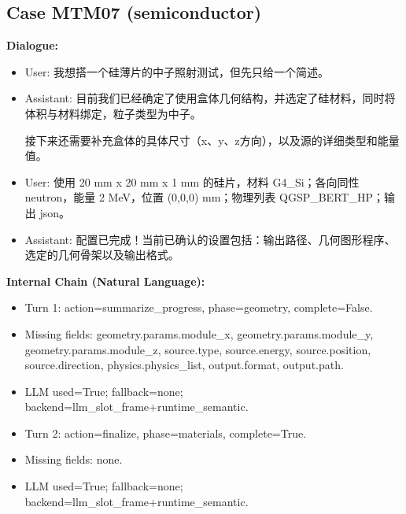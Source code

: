 \documentclass[11pt]{ctexart}
\begin{document}
\subsection{Case MTM07 (semiconductor)}
\textbf{Dialogue:}
\begin{itemize}
\item User: 我想搭一个硅薄片的中子照射测试，但先只给一个简述。
\item Assistant: 目前我们已经确定了使用盒体几何结构，并选定了硅材料，同时将体积与材料绑定，粒子类型为中子。

接下来还需要补充盒体的具体尺寸（x、y、z方向），以及源的详细类型和能量值。
\item User: 使用 20 mm x 20 mm x 1 mm 的硅片，材料 G4\_Si；各向同性 neutron，能量 2 MeV，位置 (0,0,0) mm；物理列表 QGSP\_BERT\_HP；输出 json。
\item Assistant: 配置已完成！当前已确认的设置包括：输出路径、几何图形程序、选定的几何骨架以及输出格式。
\end{itemize}
\textbf{Internal Chain (Natural Language):}
\begin{itemize}
\item Turn 1: action=summarize\_progress, phase=geometry, complete=False.
\item Missing fields: geometry.params.module\_x, geometry.params.module\_y, geometry.params.module\_z, source.type, source.energy, source.position, source.direction, physics.physics\_list, output.format, output.path.
\item LLM used=True; fallback=none; backend=llm\_slot\_frame+runtime\_semantic.
\item Turn 2: action=finalize, phase=materials, complete=True.
\item Missing fields: none.
\item LLM used=True; fallback=none; backend=llm\_slot\_frame+runtime\_semantic.
\end{itemize}
\end{document}
